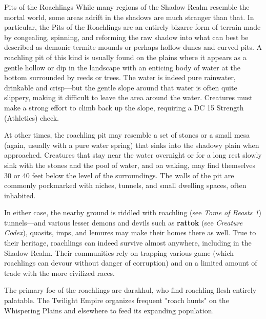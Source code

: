 \documentclass[10pt,a4paper,twoside,bg=print,twocolumn,openany,nodeprecatedcode]{dndbook}
\begin{document}
\begin{DndSidebar}[float=!b]{Pits of the Roachlings}
While many regions of the Shadow Realm resemble the mortal world, some areas adrift in the shadows are much stranger than that. In particular, the Pits of the Roachlings are an entirely bizarre form of terrain made by congealing, spinning, and reforming the raw shadow into what can best be described as demonic termite mounds or perhaps hollow dunes and curved pits. A roachling pit of this kind is usually found on the plains where it appears as a gentle hollow or dip in the landscape with an enticing body of water at the bottom surrounded by reeds or trees. The water is indeed pure rainwater, drinkable and crisp—but the gentle slope around that water is often quite slippery, making it difficult to leave the area around the water. Creatures must make a strong effort to climb back up the slope, requiring a DC 15 Strength (Athletics) check.



At other times, the roachling pit may resemble a set of stones or a small mesa (again, usually with a pure water spring) that sinks into the shadowy plain when approached. Creatures that stay near the water overnight or for a long rest slowly sink with the stones and the pool of water, and on waking, may find themselves 30 or 40 feet below the level of the surroundings. The walls of the pit are commonly pockmarked with niches, tunnels, and small dwelling spaces, often inhabited.



In either case, the nearby ground is riddled with roachling (see \textit{Tome of Beasts 1}) tunnels—and various lesser demons and devils such as \textbf{rattok} (see \textit{Creature Codex}), quasits, imps, and lemures may make their homes there as well. True to their heritage, roachlings can indeed survive almost anywhere, including in the Shadow Realm. Their communities rely on trapping various game (which roachlings can devour without danger of corruption) and on a limited amount of trade with the more civilized races.



The primary foe of the roachlings are darakhul, who find roachling flesh entirely palatable. The Twilight Empire organizes frequent "roach hunts" on the Whispering Plains and elsewhere to feed its expanding population.



\end{DndSidebar}
\end{document}
